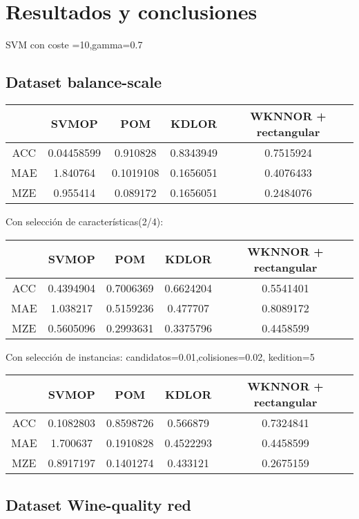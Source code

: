\chapter{Resultados y conclusiones}
\label{conclusion}

SVM con coste =10,gamma=0.7
\section{Dataset balance-scale}
\begin{tabular}{ c c c c c }
	& SVMOP & POM & KDLOR & WKNNOR + rectangular \\
	\hline	
ACC &	0.04458599 & 0.910828 & 0.8343949 & 0.7515924\\
MAE &	1.840764 & 0.1019108 & 0.1656051 & 0.4076433\\
MZE &	0.955414 & 0.089172 & 0.1656051 & 0.2484076 \\
	\hline  
\end{tabular}

Con selección de características(2/4):

\begin{tabular}{ c c c c c }
	& SVMOP & POM & KDLOR & WKNNOR + rectangular \\
	\hline	
	ACC &	0.4394904 & 0.7006369 & 0.6624204  & 0.5541401 \\
	MAE &	1.038217 & 0.5159236 & 0.477707  & 0.8089172 \\
	MZE &	0.5605096 & 0.2993631 & 0.3375796  & 0.4458599  \\
	\hline  
\end{tabular}

Con selección de instancias:
candidatos=0.01,colisiones=0.02, kedition=5

\begin{tabular}{ c c c c c }
	& SVMOP & POM & KDLOR & WKNNOR + rectangular \\
	\hline	
	ACC &	0.1082803 & 0.8598726 & 0.566879  & 0.7324841 \\
	MAE &	1.700637 & 0.1910828 & 0.4522293  & 0.4458599 \\
	MZE &	0.8917197 & 0.1401274 & 0.433121  & 0.2675159  \\
	\hline  
\end{tabular}

\section{Dataset Wine-quality red}


